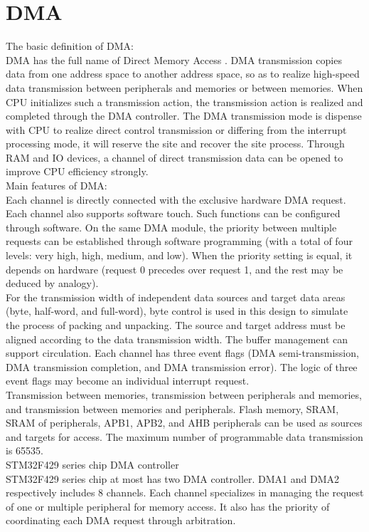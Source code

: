 \section{DMA}
\label{sec:DMA}
The basic definition of DMA: 
\\
DMA has the full name of Direct Memory Access \cite{riesbeck1986direct}. 
DMA transmission copies data from one address space to another address space, so as to realize high-speed data transmission between peripherals and memories or between memories. When CPU initializes such a transmission action, the transmission action is realized and completed through the DMA controller. The DMA transmission mode is dispense with CPU to realize direct control transmission or differing from the interrupt processing mode, it will reserve the site and recover the site process. Through RAM and IO devices, a channel of direct transmission data can be opened to improve CPU efficiency strongly. 
\\
Main features of DMA:
\\
Each channel is directly connected with the exclusive hardware DMA request. Each channel also supports software touch. Such functions can be configured through software. 
On the same DMA module, the priority between multiple requests can be established through software programming (with a total of four levels: very high, high, medium, and low). When the priority setting is equal, it depends on hardware (request 0 precedes over request 1, and the rest may be deduced by analogy). 
\\
For the transmission width of independent data sources and target data areas (byte, half-word, and full-word), byte control is used in this design to simulate the process of packing and unpacking. The source and target address must be aligned according to the data transmission width. 
The buffer management can support circulation. 
Each channel has three event flags (DMA semi-transmission, DMA transmission completion, and DMA transmission error). The logic of three event flags may become an individual interrupt request. 
\\
Transmission between memories, transmission between peripherals and memories, and transmission between memories and peripherals. 
Flash memory, SRAM, SRAM of peripherals, APB1, APB2, and AHB peripherals can be used as sources and targets for access. 
The maximum number of programmable data transmission is 65535. 
\\
STM32F429 series chip DMA controller 
\\
STM32F429 series chip at most has two DMA controller. DMA1 and DMA2 respectively includes 8 channels. Each channel specializes in managing the request of one or multiple peripheral for memory access. It also has the priority of coordinating each DMA request through arbitration. 


